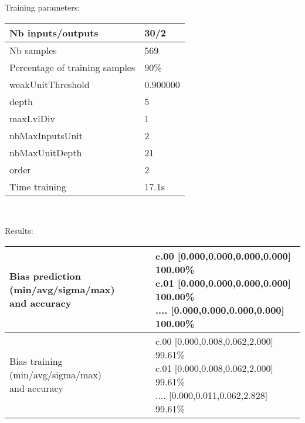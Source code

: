 Training parameters:\\
\begin{center}
\begin{tabular}{|l|l|}
\hline
Nb inputs/outputs&30/2\\
\hline
Nb samples&569\\
\hline
Percentage of training samples&90\%\\
\hline
weakUnitThreshold&0.900000\\
\hline
depth&5\\
\hline
maxLvlDiv&1\\
\hline
nbMaxInputsUnit&2\\
\hline
nbMaxUnitDepth&21\\
\hline
order&2\\
\hline
Time training&17.1s\\
\hline
\end{tabular}\\
\end{center}\newline
Results:
\begin{center}
\begin{tabular}{|l|l|}
\hline
\makecell{Bias prediction (min/avg/sigma/max)\\and accuracy}&\makecell{c.00 [0.000,0.000,0.000,0.000] 100.00\%\\
c.01 [0.000,0.000,0.000,0.000] 100.00\%\\
.... [0.000,0.000,0.000,0.000] 100.00\%\\
}\\

\hline
\makecell{Bias training (min/avg/sigma/max)\\and accuracy}&\makecell{c.00 [0.000,0.008,0.062,2.000] 99.61\%\\
c.01 [0.000,0.008,0.062,2.000] 99.61\%\\
.... [0.000,0.011,0.062,2.828] 99.61\%\\
}\\
\hline
\end{tabular}\
\end{center}
